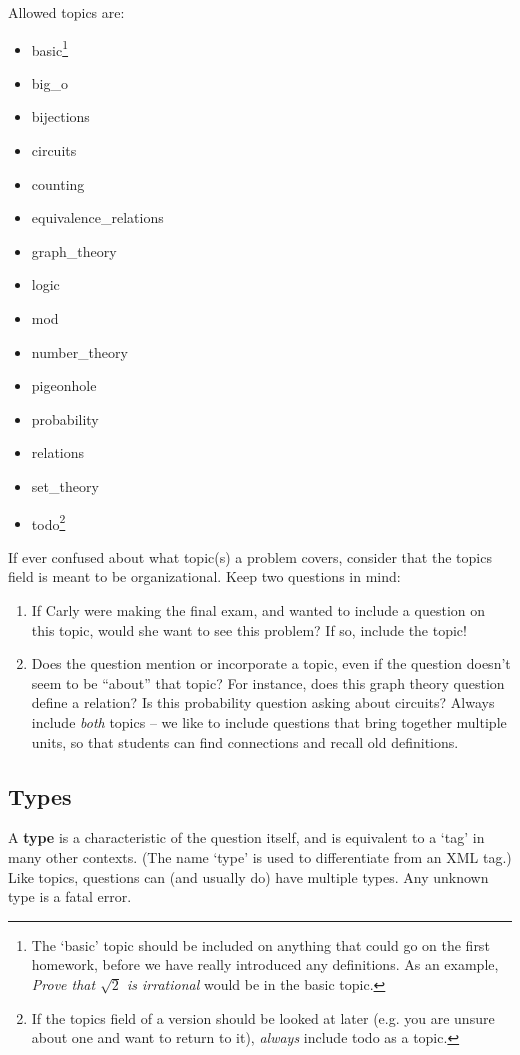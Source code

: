{    Allowed topics are:
    \begin{itemize}\itemsep0pt
      \item basic\footnote{The `basic' topic should be included on anything that could go on the first homework, before we have really introduced any definitions. As an example, \textit{Prove that $\sqrt 2$ is irrational} would be in the basic topic.}
      \item big\_o
      \item bijections
      \item circuits
      \item counting
      \item equivalence\_relations
      \item graph\_theory
      \item logic
      \item mod
      \item number\_theory
      \item pigeonhole
      \item probability
      \item relations
      \item set\_theory
      \item todo\footnote{If the topics field of a version should be looked at later (e.g. you are unsure about one and want to return to it), \textit{always} include todo as a topic.}
    \end{itemize}
    
    If ever confused about what topic(s) a problem covers, consider that the topics field is meant to be organizational. Keep two questions in mind:
    
    \begin{enumerate}[1.]\itemsep0pt
      \item If Carly were making the final exam, and wanted to include a question on this topic, would she want to see this problem? If so, include the topic!
      \item Does the question mention or incorporate a topic, even if the question doesn't seem to be ``about'' that topic? For instance, does this graph theory question define a relation? Is this probability question asking about circuits? Always include \textit{both} topics -- we like to include questions that bring together multiple units, so that students can find connections and recall old definitions.
    \end{enumerate}
  
  \subsection{Types}
    A \textbf{type} is a characteristic of the question itself, and is equivalent to a `tag' in many other contexts. (The name `type' is used to differentiate from an XML tag.) Like topics, questions can (and usually do) have multiple types. Any unknown type is a fatal error.
    
}
